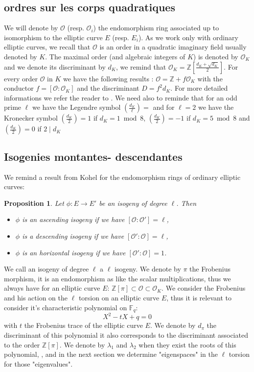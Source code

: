 \documentclass{lms}
\newtheorem{prop}[thm]{Proposition}
\begin{document}
\subsection{ordres sur les corps quadratiques}%
We will denote by $\mathcal{O}$ (resp. $\mathcal{O}_i$) the endomorphism ring associated up to isomorphism to the elliptic curve $E$ (resp. $E_i$). As we work only with ordinary elliptic curves, we recall that $\mathcal{O}$ is an order in a quadratic imaginary field usually denoted by $K$. The maximal order (and algebraic integers of $K$) is denoted by $\mathcal{O}_K$ and we denote its discriminant by $d_K$, we remind that $\mathcal{O}_K=\mathbb{Z}[\frac{d_K+\sqrt{d_K}}{2}]$. For every order $\mathcal{O}$ in $K$ we have the following results : $\mathcal{O}= \mathbb{Z}+ f \mathcal{O}_K$ with the conductor $f=[\mathcal{O}:\mathcal{O}_K]$ and the discriminant $D=f^2d_K$. For more detailed informations we refer the reader to \cite{Cox89}. We need also to reminde that for an odd prime $\ell$ we have the Legendre symbol $\left( \frac{d_K}{\ell} \right)=$ and for $\ell=2$ we have the Kronecker symbol $\left( \frac{d_K}{2} \right)= 1$ if $d_K = 1 \bmod 8$, $\left( \frac{d_K}{2} \right)= -1$ if $d_K = 5 \bmod 8$ and $\left( \frac{d_K}{2} \right)= 0$ if $2 \mid d_K$ %


\subsection{Isogenies montantes- descendantes}
We remind a result from Kohel \cite{Kohel} for the endomorphism rings of ordinary elliptic curves:
\begin{prop}
Let $\phi:E \rightarrow E'$ be an isogeny of degree $\ell$. Then 
\begin{itemize}
\item $\phi$ is an ascending isogeny if we have $[\mathcal{O}:\mathcal{O'}]=\ell$,
\item $\phi$ is a descending isogeny if we have $[\mathcal{O'}:\mathcal{O}]=\ell$,
\item $\phi$ is an horizontal isogeny if we have $[\mathcal{O'}:\mathcal{O}]=1$.
\end{itemize}
\end{prop}
We call an isogeny of degree $\ell$ a $\ell$ isogeny.
We denote by $\pi$ the Frobenius morphism, it is an endomorphism as like the scalar multiplications, thus we always have for an elliptic curve $E$:
$\mathbb{Z}[\pi] \subset \mathcal{O} \subset \mathcal{O}_K$.
We consider the Frobenius and his action on the $\ell$ torsion on an elliptic curve $E$, thus it is relevant to consider it's characteristic polynomial on $\mathbb{F}_q$:
\begin{equation}
X^2 - tX +q = 0
\end{equation}
with $t$ the Frobenius trace of the elliptic curve $E$. We denote by $d_{\pi}$ the discriminant of this polynomial it also corresponds to the discriminant associated to the order $\mathbb{Z}[\pi]$. We denote by $\lambda_1$ and $\lambda_2$ when they exist the roots of this polynomial, , and in the next section we  determine "eigenspaces" in the $\ell$ torsion for those "eigenvalues".
\end{document}
